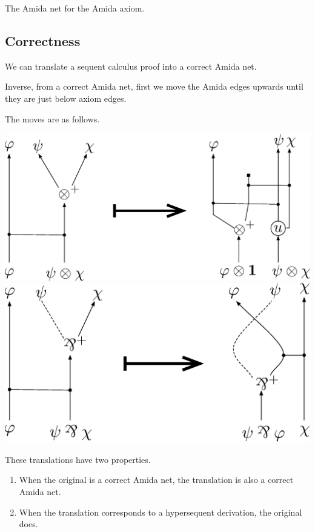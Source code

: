  \begin{example}
  The Amida net for the Amida axiom.
 \end{example}

\subsection{Correctness}


We can translate a sequent calculus proof into a correct Amida net.

Inverse, from a correct Amida net, first we move the Amida edges upwards
until they are just below axiom edges.

The moves are as follows.
 \begin{center}
\includegraphics[scale=0.4]{tensor-move.eps}
\\
\includegraphics[scale=0.4]{parr-move.eps}
 \end{center}
These translations have two properties.
\begin{enumerate}
 \item When the original is a correct Amida net, the translation is also
       a correct Amida net.
 \item When the translation corresponds to a hypersequent derivation,
       the original does.
\end{enumerate}
